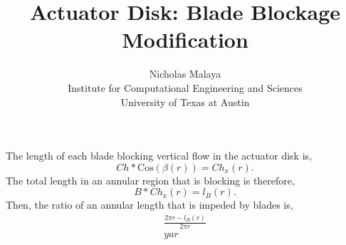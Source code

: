 \documentclass{article}
\title{\bf{Actuator Disk: Blade Blockage Modification}}
\author{Nicholas Malaya \\ Institute for Computational Engineering and Sciences \\ University of Texas at Austin} \date{}
\begin{document}
\maketitle

The length of each blade blocking vertical flow in the actuator disk is, 
\begin{equation}
  Ch * \text{Cos}(\beta(r)) = Ch_x(r). 
\end{equation}
The total length in an annular region that is blocking is therefore,
\begin{equation}
  B * Ch_x(r) = l_B(r). 
\end{equation}
Then, the ratio of an annular length that is impeded by blades is,
\begin{eqnarray}
  \frac{2\pi r- l_B(r)}{2 \pi r}\\
  yar
\end{eqnarray}
\end{document}
